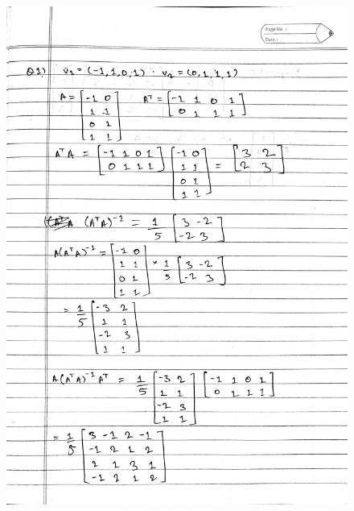 \documentclass[12pt]{article}
\begin{document}
\begin{figure}[h] %
\centering
\includegraphics[scale=0.15]{2022-04-29 21-37-46 - ALA DA - p1.jpg}
\end{figure}
\end{document}
